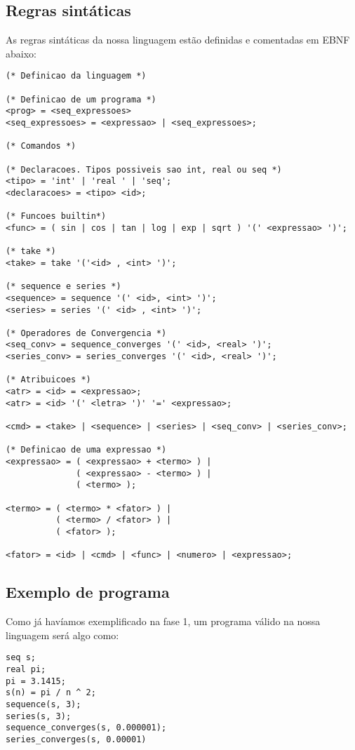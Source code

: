 \documentclass[a4 paper, 12pt]{article}
\begin{document}
\subsection{Regras sint\'aticas}
As regras sint\'aticas da nossa linguagem est\~ao definidas e
comentadas em EBNF abaixo:
\begin{verbatim}
(* Definicao da linguagem *)

(* Definicao de um programa *)
<prog> = <seq_expressoes>
<seq_expressoes> = <expressao> | <seq_expressoes>;

(* Comandos *)

(* Declaracoes. Tipos possiveis sao int, real ou seq *)
<tipo> = 'int' | 'real ' | 'seq';
<declaracoes> = <tipo> <id>;

(* Funcoes builtin*)
<func> = ( sin | cos | tan | log | exp | sqrt ) '(' <expressao> ')';

(* take *)
<take> = take '('<id> , <int> ')';

(* sequence e series *)
<sequence> = sequence '(' <id>, <int> ')';
<series> = series '(' <id> , <int> ')';

(* Operadores de Convergencia *)
<seq_conv> = sequence_converges '(' <id>, <real> ')';
<series_conv> = series_converges '(' <id>, <real> ')';

(* Atribuicoes *)
<atr> = <id> = <expressao>;
<atr> = <id> '(' <letra> ')' '=' <expressao>;

<cmd> = <take> | <sequence> | <series> | <seq_conv> | <series_conv>;

(* Definicao de uma expressao *)
<expressao> = ( <expressao> + <termo> ) |
              ( <expressao> - <termo> ) |
              ( <termo> );

<termo> = ( <termo> * <fator> ) |
          ( <termo> / <fator> ) |
          ( <fator> );

<fator> = <id> | <cmd> | <func> | <numero> | <expressao>;

\end{verbatim}

\subsection{Exemplo de programa}
Como j\'a hav\'iamos exemplificado na fase 1, um programa v\'alido na
nossa linguagem ser\'a algo como:
\begin{verbatim}
seq s;
real pi;
pi = 3.1415;
s(n) = pi / n ^ 2;
sequence(s, 3);
series(s, 3);
sequence_converges(s, 0.000001);
series_converges(s, 0.00001)
\end{verbatim}
\end{document}
